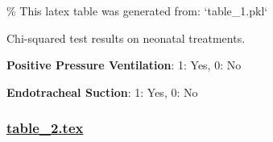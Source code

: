 \documentclass[11pt]{article}
\begin{document}
\begin{codeoutput}
\% This latex table was generated from: `table\_1.pkl`
\begin{table}[h]
\caption{Impact of change in treatment policy on neonatal treatments.}
\label{table:Neonate\_Treatments}
\begin{threeparttable}
\renewcommand{\TPTminimum}{\linewidth}
\begin{tablenotes}
\footnotesize
\item Chi-squared test results on neonatal treatments.
\item \textbf{Positive Pressure Ventilation}: 1: Yes, 0: No
\item \textbf{Endotracheal Suction}: 1: Yes, 0: No
\end{tablenotes}
\end{threeparttable}
\end{table}

\end{codeoutput}

\subsubsection*{\hyperlink{code-LaTeX Table Design-table-2-tex}{table\_2.tex}}
\end{document}
